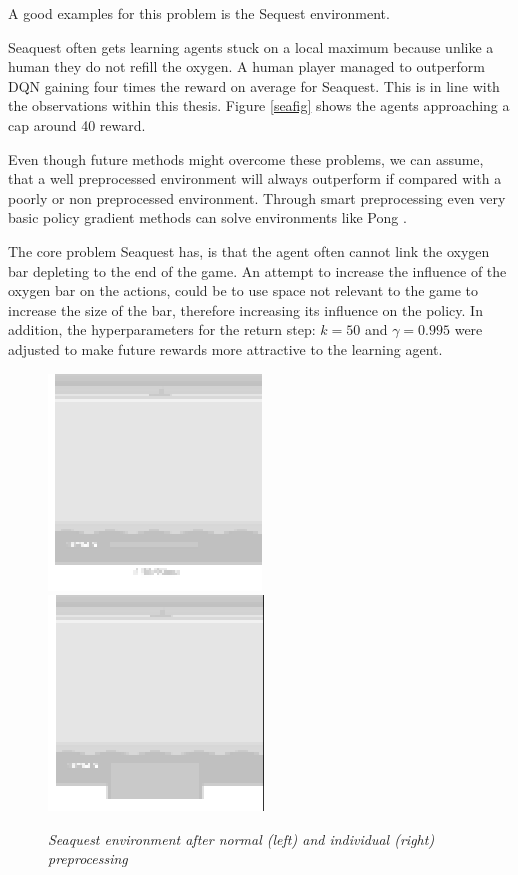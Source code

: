 A good examples for this problem is the Sequest environment. 

Seaquest often gets learning agents stuck on a local maximum because unlike a human they do not refill the oxygen.
A human player managed to outperform DQN \citep{nature} gaining four times the reward on average for Seaquest.
This is in line with the observations within this thesis. Figure \ref{seafig} shows the agents approaching a cap around 40 reward.

Even though future methods might overcome these problems, we can assume, that a well preprocessed environment will always outperform if compared with a poorly or non preprocessed environment.
Through smart preprocessing even very basic policy gradient methods can solve environments like Pong \citep{karpathy}.

The core problem Seaquest has, is that the agent often cannot link the oxygen bar depleting to the end of the game. 
An attempt to increase the influence of the oxygen bar on the actions, could be to use space not relevant to the game to increase the size of the bar, therefore increasing its influence on the policy.
In addition, the hyperparameters for the return step: $k=50$ and $\gamma =0.995$ were adjusted to make future rewards more attractive to the learning agent.

\begin{figure}[h]
\includegraphics[scale=1]{bilder/seaquestgamenopre.png}
\includegraphics[scale=1]{bilder/seaquestgameprepro.png}
\caption{\textit{Seaquest environment after normal (left) and individual (right) preprocessing}}
\end{figure}

